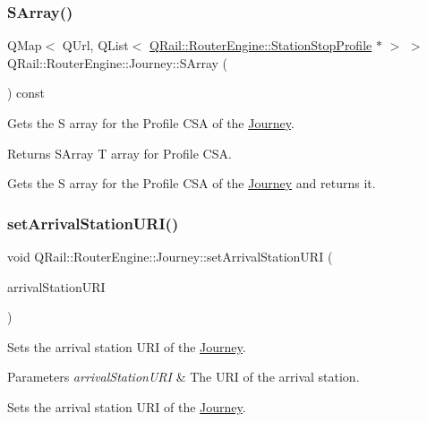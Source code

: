 \subsubsection{\texorpdfstring{SArray()}{SArray()}}
{\footnotesize\ttfamily Q\+Map$<$ Q\+Url, Q\+List$<$ \mbox{\hyperlink{classQRail_1_1RouterEngine_1_1StationStopProfile}{Q\+Rail\+::\+Router\+Engine\+::\+Station\+Stop\+Profile}} $\ast$ $>$ $>$ Q\+Rail\+::\+Router\+Engine\+::\+Journey\+::\+S\+Array (\begin{DoxyParamCaption}{ }\end{DoxyParamCaption}) const}



Gets the S array for the Profile C\+SA of the \mbox{\hyperlink{classQRail_1_1RouterEngine_1_1Journey}{Journey}}. 

\begin{DoxyReturn}{Returns}
S\+Array T array for Profile C\+SA.
\end{DoxyReturn}
Gets the S array for the Profile C\+SA of the \mbox{\hyperlink{classQRail_1_1RouterEngine_1_1Journey}{Journey}} and returns it. \mbox{\label{classQRail_1_1RouterEngine_1_1Journey_a9de983071525978f05440677003566df}} 
\subsubsection{\texorpdfstring{setArrivalStationURI()}{setArrivalStationURI()}}
{\footnotesize\ttfamily void Q\+Rail\+::\+Router\+Engine\+::\+Journey\+::set\+Arrival\+Station\+U\+RI (\begin{DoxyParamCaption}\item[{const Q\+Url \&}]{arrival\+Station\+U\+RI }\end{DoxyParamCaption})}



Sets the arrival station U\+RI of the \mbox{\hyperlink{classQRail_1_1RouterEngine_1_1Journey}{Journey}}. 


\begin{DoxyParams}{Parameters}
{\em arrival\+Station\+U\+RI} & The U\+RI of the arrival station.\\
\hline
\end{DoxyParams}
Sets the arrival station U\+RI of the \mbox{\hyperlink{classQRail_1_1RouterEngine_1_1Journey}{Journey}}. \mbox{\label{classQRail_1_1RouterEngine_1_1Journey_aed24efbeb5390322b6b2bde3034cbe88}} 
